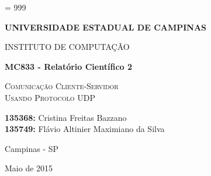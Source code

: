 \documentclass[12pt,a4paper]{article}
\begin{document}
\tolerance = 999
\sloppy


\thispagestyle{empty}

\begin{center}{\large \bf UNIVERSIDADE ESTADUAL DE CAMPINAS} \end{center}
\begin{center}{\large INSTITUTO DE COMPUTAÇÃO} \end{center}

\begin{center}
\begin{minipage}[tl]{31mm}
\end{minipage}
\end{center}

\vspace*{3.5cm}

\begin{center}
{\Large \bf MC833 - Relatório Científico 2}

\vspace*{2.0cm}

\textsc{\Large Comunicação Cliente-Servidor} \\ [0.1cm]
\textsc{\Large Usando Protocolo UDP}

\vspace{2.5cm}

\textbf{135368:} Cristina Freitas Bazzano \\
\textbf{135749:} Flávio Altinier Maximiano da Silva

\vspace{7.5cm}

{\large Campinas - SP}
\vspace*{0.2cm}

{\large Maio de 2015}
\end{center}

\clearpage

\onehalfspacing
\tableofcontents 
\clearpage
\onehalfspacing

\begin{abstract}
Este trabalho focou-se no estudo temporal de redes cliente-servidor baseadas em comunicação UDP e um comparativo com um estudo anterior baseado em comunicação TCP. Foi implementado um serviço de locadora de filmes baseado em {\it MySQL} no servidor, e ao cliente foram adicionadas diversas operações de acesso ao banco, baseando-se em operações de consultas pequenas, grandes e de escrita. Observou-se que a escrita no banco é o processo mais lento, enquanto operações de consultas extensas são apenas brevemente mais lentas que buscas mais curtas, o que também ocorreu com o TCP. Outro ponto interessante medido foi a confiabilidade das transmissões, em ambos os protocolos nenhuma mensagem foi perdida. Notamos também que o tempo total de comunicação no protocolo UDP foi bem menor que usando TCP, chegando a cerca de 10 vezes menor em alguns testes. Além disso, uma breve análise de tamanho de código mostrou que operações de redes não são as mais presentes em uma implementação desse tipo.
\end{abstract}
\end{document}
